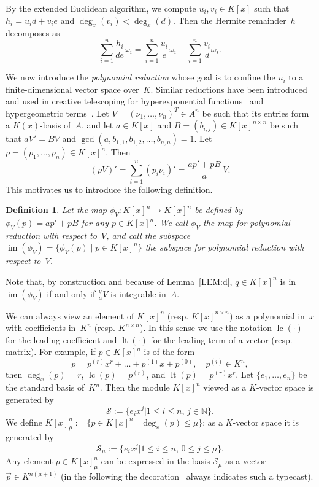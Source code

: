 \documentclass{sig-alternate}
\newtheorem{defi}[theorem]{Definition}
\newcommand{\bN}{ {\mathbb N}}
\newcommand{\cS}{ {\mathcal S}}
\def\lc{\operatorname{lc}}
\def\lt{\operatorname{lt}}
\def\im{\operatorname{im}}
\begin{document}
By the extended Euclidean algorithm, we compute $u_i, v_i\in K[x]$ such that
$h_i = u_i d + v_i e$ and $\deg_x(v_i) < \deg_x(d)$. Then the Hermite remainder~$h$
decomposes as
\begin{equation}\label{EQ:h}
  \sum_{i=1}^n \frac{h_i}{de}\omega_i =  \sum_{i=1}^n \frac{u_i}{e}\omega_i + \sum_{i=1}^n \frac{v_i}{d}\omega_i.
\end{equation}

We now introduce the \emph{polynomial reduction} whose goal is to confine the $u_i$ to a finite-dimensional
vector space over~$K$. Similar reductions have been introduced and used in creative telescoping
for hyperexponential functions~\cite{bostan13a} and hypergeometric terms~\cite{chen15a}.
Let $V = (\nu_1, \ldots, \nu_n)^T\in A^n$ be such that its entries form a $K(x)$-basis of~$A$,
and let $a\in K[x]$ and $B = (b_{i, j})\in K[x]^{n \times n}$ be such that $aV'=BV$ and
$\gcd(a, b_{1, 1}, b_{1, 2}, \ldots, b_{n ,n})=1$. Let $p = (p_1, \ldots, p_n)\in K[x]^n$. Then
\begin{equation} \label{EQ:polyred}
  (pV)' = \sum_{i=1}^n (p_i \nu_i)' = \frac{ap' + pB}{a}\, V.
\end{equation}
This motivates us to introduce the following definition.
\begin{defi}
Let the map $\phi_V\colon K[x]^n \rightarrow K[x]^n$
be defined by $\phi_V(p) = ap' + pB$ for any $p\in K[x]^n$.
We call $\phi_V$ the \emph{map for polynomial reduction} with respect to~$V$, and call
the subspace $\im(\phi_V) = \{\phi_V(p) \mid p \in K[x]^n\}$
the \emph{subspace for polynomial reduction} with respect to~$V$.
\end{defi}

Note that, by construction and because of Lemma~\ref{LEM:d}, $q\in K[x]^n$ is in
$\im(\phi_V)$ if and only if $\frac{q}{a}V$ is integrable in~$A$.

We can always view an element of $K[x]^n$ (resp. $K[x]^{n\times n}$) as a polynomial in~$x$
with coefficients in~$K^n$ (resp. $K^{n\times n}$). In this sense we use the notation $\lc(\cdot)$
for the leading coefficient and $\lt(\cdot)$ for the leading term of a vector (resp. matrix).
For example, if $p\in K[x]^n$ is of the form
\[
  p = p^{(r)}x^r + \dots + p^{(1)}x + p^{(0)},\quad p^{(i)}\in K^n,
\]
then $\deg_x(p)=r$, $\lc(p)=p^{(r)}$, and $\lt(p)=p^{(r)}x^r$.
Let $\{e_1, \ldots, e_n\}$ be the standard basis of~$K^n$.
Then the module $K[x]^n$ viewed as a $K$-vector space is generated by
\[
  \cS := \bigl\{e_ix^j \mathrel{\big|} 1\leq i \leq n,\, j\in \bN\bigr\}.
\]
We define $K[x]_\mu^n:=\{p\in K[x]^n \mid \deg_x(p) \leq \mu\}$; as a $K$-vector
space it is generated by
\[
  \cS_\mu := \bigl\{e_ix^j \mathrel{\big|} 1\leq i \leq n,\, 0\leq j\leq \mu\bigr\}.
\]
Any element $p\in K[x]_\mu^n$ can be expressed in the
basis $\cS_\mu$ as a vector $\vec{p}\in K^{n(\mu+1)}$ (in the following the
decoration~\raisebox{-1pt}{$\vec{}\;$} always indicates such a typecast).
\end{document}
